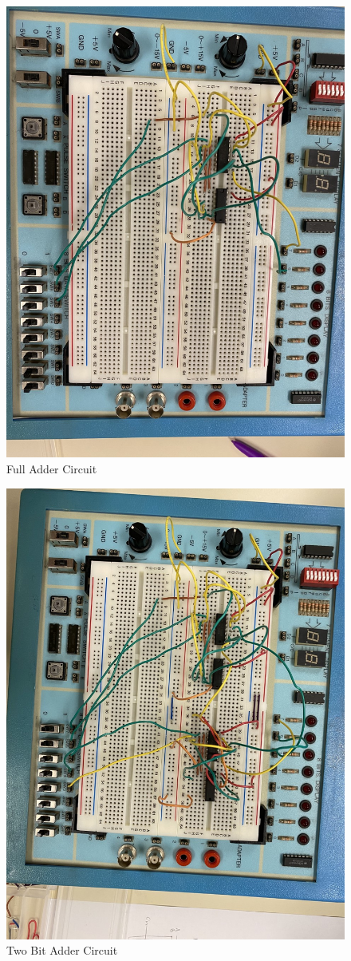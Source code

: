 \documentclass[]{report}
\begin{document}
\begin{figure}[ht]
\centering
\includegraphics{FullAdder.PNG}
\caption{Full Adder Circuit}
\label{fig:Full Adder}
\end{figure}

\begin{figure}[ht]
\centering
\includegraphics{TwoBitAdder.PNG}
\caption{Two Bit Adder Circuit}
\label{fig:Two bit Adder}
\end{figure}
\end{document}

